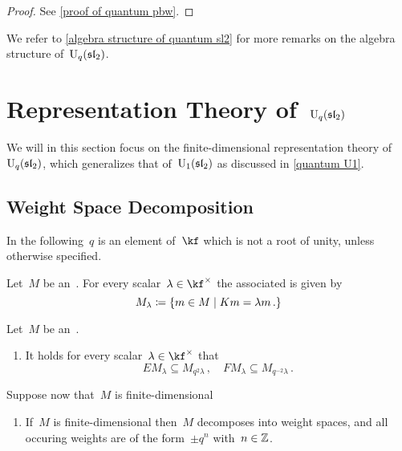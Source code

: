 \documentclass[a4paper, 11pt, oneside]{scrartcl}
\begin{document}
\begin{proof}
  See \cref{proof of quantum pbw}.
\end{proof}

We refer to \cref{algebra structure of quantum sl2} for more remarks on the algebra structure of~$\operatorname{U}_q(\mathfrak{sl}_2)$.





\section{Representation Theory of~$\operatorname{U}_q(\mathfrak{sl}_2)$}

We will in this section focus on the finite-dimensional representation theory of~$\operatorname{U}_q(\mathfrak{sl}_2)$, which generalizes that of~$\operatorname{U}_1(\mathfrak{sl}_2)$ as discussed in \cref{quantum U1}.



\subsection{Weight Space Decomposition}

\begin{convention}
  In the following~$q$ is an element of~$\kf$ which is not a root of unity, unless otherwise specified.
\end{convention}

\begin{definition}
  Let~$M$ be an~.
  For every scalar~$\lambda \in \kf^{\times}$ the associated  is given by
  \[
    M_\lambda
    \defined
    \{
      m \in M
    \suchthat
      K m = \lambda m \,.
    \}
  \]
\end{definition}

\begin{proposition}
  \label{quantum weight decomposition}
  Let~$M$ be an~.
  \begin{enumerate}
    \item
      It holds for every scalar~$\lambda \in \kf^{\times}$ that
      \[
        E M_\lambda \subseteq M_{q^2 \lambda} \,,
        \quad
        F M_\lambda \subseteq M_{q^{-2} \lambda} \,.
      \]
  \end{enumerate}
  Suppose now that~$M$ is finite-dimensional
  \begin{enumerate}[resume*]
    \item
      If~$M$ is finite-dimensional then~$M$ decomposes into weight spaces, and all occuring weights are of the form~$\pm q^n$ with~$n \in \mathbb{Z}$.
  \end{enumerate}
\end{proposition}
\end{document}
